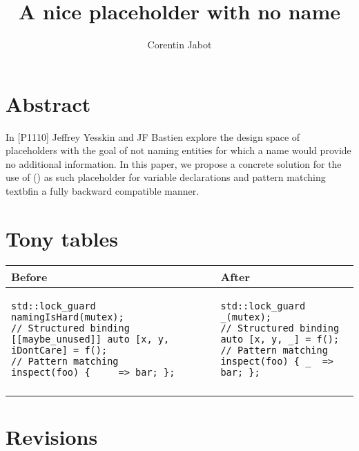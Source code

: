 \documentclass{wg21}
\title{A nice placeholder with no name}
\author{Corentin Jabot}{corentin.jabot@gmail.com}
\begin{document}
\maketitle


\section{Abstract}

In [P1110]\cite{P1110R0} Jeffrey Yesskin and JF Bastien explore the design space of placeholders
with the goal of not naming entities for which a name would provide no additional information.
In this paper, we propose a concrete solution for the use of \tcode{_} () as such placeholder
for variable declarations and pattern matching textbf{in a fully backward compatible manner}.

\section{Tony tables}
\begin{center}
\begin{tabular}{l|l}
Before & After\\ \hline

\begin{minipage}[t]{0.5\textwidth}
\begin{lstlisting}[style=color]
std::lock_guard namingIsHard(mutex);
// Structured binding
[[maybe_unused]] auto [x, y, iDontCare] = f();
// Pattern matching
inspect(foo) { __  => bar; };

\end{lstlisting}
\end{minipage}
&
\begin{minipage}[t]{0.5\textwidth}
\begin{lstlisting}[style=color]
std::lock_guard _(mutex);
// Structured binding
auto [x, y, _] = f();
// Pattern matching
inspect(foo) { _  => bar; };

\end{lstlisting}
\end{minipage}
\\\\ \hline

\end{tabular}
\end{center}

\section{Revisions}
\end{document}

